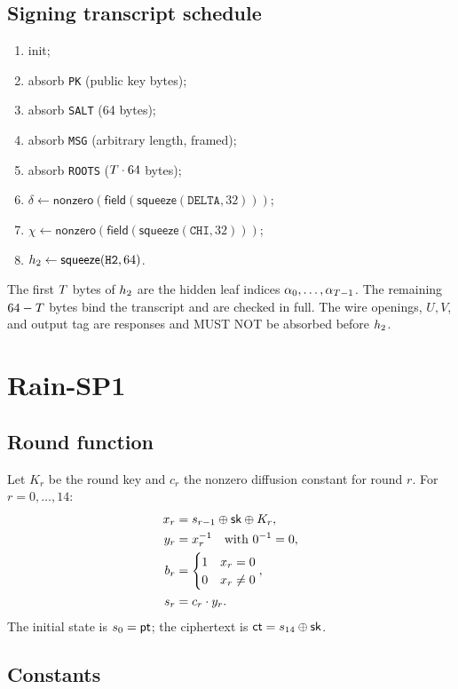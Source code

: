 \documentclass[11pt,a4paper]{article}
\begin{document}
\subsection{Signing transcript schedule}

\begin{enumerate}
  \item init;
  \item absorb \texttt{PK} (public key bytes);
  \item absorb \texttt{SALT} (64 bytes);
  \item absorb \texttt{MSG} (arbitrary length, framed);
  \item absorb \texttt{ROOTS} ($T\cdot64$ bytes);
  \item $\delta\gets\mathsf{nonzero}(\mathsf{field}(\mathsf{squeeze}(\texttt{DELTA},32)))$;
  \item $\chi\gets\mathsf{nonzero}(\mathsf{field}(\mathsf{squeeze}(\texttt{CHI},32)))$;
  \item $h_2\gets\mathsf{squeeze}(\texttt{H2},64)$.
\end{enumerate}
The first $T$ bytes of $h_2$ are the hidden leaf indices
$\alpha_0,\ldots,\alpha_{T-1}$. The remaining $64-T$ bytes bind the
transcript and are checked in full. The wire openings, $U,V$, and output tag
are responses and MUST NOT be absorbed before $h_2$.

\section{Rain-SP1}

\subsection{Round function}

Let $K_r$ be the round key and $c_r$ the nonzero diffusion constant for round
$r$. For $r=0,\ldots,14$:
\begin{align}
x_r &= s_{r-1}\oplus\mathsf{sk}\oplus K_r,\\
y_r &= x_r^{-1} \quad\text{with }0^{-1}=0,\\
b_r &= \begin{cases}1&x_r=0\\0&x_r\ne0\end{cases},\\
s_r &= c_r\cdot y_r.
\end{align}
The initial state is $s_0=\mathsf{pt}$; the ciphertext is
$\mathsf{ct}=s_{14}\oplus\mathsf{sk}$.

\subsection{Constants}
\end{document}
